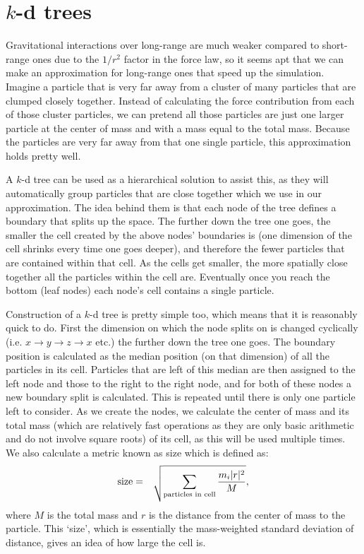 \documentclass[11pt]{article}
\begin{document}

\section{$k$-d trees}
Gravitational interactions over long-range are much weaker compared to short-range ones due to the $1/r^2$ factor in the force law, so it seems apt that we can make an approximation for long-range ones that speed up the simulation.
Imagine a particle that is very far away from a cluster of many particles that are clumped closely together.
Instead of calculating the force contribution from each of those cluster particles, we can pretend all those particles are just one larger particle at the center of mass and with a mass equal to the total mass.
Because the particles are very far away from that one single particle, this approximation holds pretty well.


A $k$-d tree can be used as a hierarchical solution to assist this, as they will automatically group particles that are close together which we use in our approximation.
The idea behind them is that each node of the tree defines a boundary that splits up the space.
The further down the tree one goes, the smaller the cell created by the above nodes' boundaries is (one dimension of the cell shrinks every time one goes deeper), and therefore the fewer particles that are contained within that cell.
As the cells get smaller, the more spatially close together all the particles within the cell are.
Eventually once you reach the bottom (leaf nodes) each node's cell contains a single particle.

Construction of a $k$-d tree is pretty simple too, which means that it is reasonably quick to do.
First the dimension on which the node splits on is changed cyclically (i.e. $x \rightarrow y \rightarrow z \rightarrow x$ etc.) the further down the tree one goes.
The boundary position is calculated as the median position (on that dimension) of all the particles in its cell.
Particles that are left of this median are then assigned to the left node and those to the right to the right node, and for both of these nodes a new boundary split is calculated.
This is repeated until there is only one particle left to consider.
As we create the nodes, we calculate the center of mass and its total mass (which are relatively fast operations as they are only basic arithmetic and do not involve square roots) of its cell, as this will be used multiple times.
We also calculate a metric known as size which is defined as:
\begin{eqnarray}
	\textnormal{size} &=& \sqrt{\sum_{\textnormal{particles in cell}} \frac{m_i |r|^2}{M}},
\end{eqnarray}
where $M$ is the total mass and $r$ is the distance from the center of mass to the particle.
This `size', which is essentially the mass-weighted standard deviation of distance, gives an idea of how large the cell is.
\end{document}
